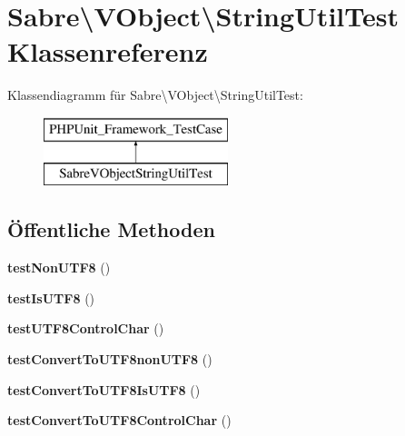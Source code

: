 \hypertarget{class_sabre_1_1_v_object_1_1_string_util_test}{}\section{Sabre\textbackslash{}V\+Object\textbackslash{}String\+Util\+Test Klassenreferenz}
\label{class_sabre_1_1_v_object_1_1_string_util_test}
Klassendiagramm für Sabre\textbackslash{}V\+Object\textbackslash{}String\+Util\+Test\+:\begin{figure}[H]
\begin{center}
\leavevmode
\includegraphics[height=2.000000cm]{class_sabre_1_1_v_object_1_1_string_util_test}
\end{center}
\end{figure}
\subsection*{Öffentliche Methoden}
\begin{DoxyCompactItemize}
\item 
\mbox{\label{class_sabre_1_1_v_object_1_1_string_util_test_ae5cef9e4f1568fbe64b3ceb85111a9cf}} 
{\bfseries test\+Non\+U\+T\+F8} ()
\item 
\mbox{\label{class_sabre_1_1_v_object_1_1_string_util_test_a85212b6ee304a54c3a92638aa4f4e244}} 
{\bfseries test\+Is\+U\+T\+F8} ()
\item 
\mbox{\label{class_sabre_1_1_v_object_1_1_string_util_test_aa6ff41bf6da92992e1dddd906f451c36}} 
{\bfseries test\+U\+T\+F8\+Control\+Char} ()
\item 
\mbox{\label{class_sabre_1_1_v_object_1_1_string_util_test_a239084f8f3fb627ceedef125482645c2}} 
{\bfseries test\+Convert\+To\+U\+T\+F8non\+U\+T\+F8} ()
\item 
\mbox{\label{class_sabre_1_1_v_object_1_1_string_util_test_ae1ca09b21a993629f9c5cc205dc22b9a}} 
{\bfseries test\+Convert\+To\+U\+T\+F8\+Is\+U\+T\+F8} ()
\item 
\mbox{\label{class_sabre_1_1_v_object_1_1_string_util_test_ae3387279a59c1e70ea2e0cd7e63446da}} 
{\bfseries test\+Convert\+To\+U\+T\+F8\+Control\+Char} ()
\end{DoxyCompactItemize}


